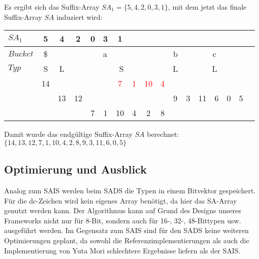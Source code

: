\noindent Es ergibt sich das Suffix-Array $SA_1 = \{5, 4, 2, 0, 3, 1\}$, mit dem jetzt das finale Suffix-Array $SA$ induziert wird:

\begin{center}
  \begin{tabular}{ | l | c | c | c | c | c | c | c | c | c | c | c | c | c | c | c | c | }
    \hline
     $SA_1$ & 5 & 4 & 2 & 0 & 3 & 1 & & & & & & & & & \\ \hline
   $Bucket$ &\$ & \multicolumn{7}{c}{a} &   & \multicolumn{1}{c}{b} &   & \multicolumn{3}{c}{c} & \\ \hline
      $Typ$ & S & \multicolumn{1}{c}{L} &   & \multicolumn{5}{c}{S} &   & \multicolumn{1}{c}{L} &    & \multicolumn{3}{c}{L} &\\ \hline
            & 14 & & & & & \textcolor{red}{7} & \textcolor{red}{1} & \textcolor{red}{10} & \textcolor{red}{4} & & & & & & \\ \hline
            & & 13 & 12 & & & & & & & 9 & 3 & 11 & 6 & 0 & 5 \\ \hline
            & & & & 7 & 1 & 10 & 4 & 2 & 8 & & & & & & \\
    \hline
  \end{tabular}
\end{center}
\bigskip
Damit wurde das endgültige Suffix-Array $SA$ berechnet: $\{14, 13, 12, 7, 1, 10, 4, 2, 8, 9, 3, 11, 6, 0, 5\}$

\subsection{Optimierung und Ausblick}
Analog zum SAIS werden beim SADS die Typen in einem Bitvektor gespeichert. Für die dc-Zeichen wird kein eigenes Array benötigt, da hier das SA-Array genutzt werden kann. Der Algorithmus kann auf Grund des Designs unseres Frameworks nicht nur für 8-Bit, sondern auch für 16-, 32-, 48-Bittypen usw. ausgeführt werden. Im Gegensatz zum SAIS sind für den SADS keine weiteren Optimierungen geplant, da sowohl die Referenzimplementierungen als auch die Implementierung von Yuta Mori schlechtere Ergebnisse liefern als der SAIS.
 \newpage





























